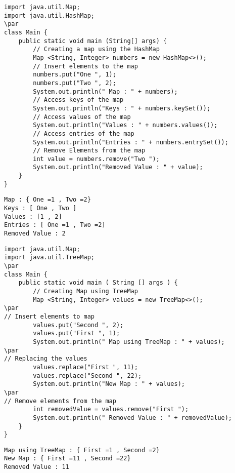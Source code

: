 \documentclass{book}
\def\lthtmlcheckvsize{\ifdim\ht\sizebox<\vsize 
  \ifdim\wd\sizebox<\hsize\expandafter\hfill\fi \expandafter\vfill
  \else\expandafter\vss\fi}%
\begin{document}
{\newpage\clearpage
{}%
\begin{lstlisting}
import java.util.Map;
import java.util.HashMap;
\par
class Main {
	public static void main (String[] args) {
		// Creating a map using the HashMap
		Map <String, Integer> numbers = new HashMap<>();
		// Insert elements to the map
		numbers.put("One ", 1);
		numbers.put("Two ", 2);
		System.out.println(" Map : " + numbers);
		// Access keys of the map
		System.out.println("Keys : " + numbers.keySet());
		// Access values of the map
		System.out.println("Values : " + numbers.values());
		// Access entries of the map
		System.out.println("Entries : " + numbers.entrySet());
		// Remove Elements from the map
		int value = numbers.remove("Two ");
		System.out.println("Removed Value : " + value);
	}
}
\end{lstlisting}%
\lthtmlfigureZ
\lthtmlcheckvsize\clearpage}

{\newpage\clearpage
{}%
\begin{lstlisting}
Map : { One =1 , Two =2}
Keys : [ One , Two ]
Values : [1 , 2]
Entries : [ One =1 , Two =2]
Removed Value : 2
\end{lstlisting}%
\lthtmlfigureZ
\lthtmlcheckvsize\clearpage}

{\newpage\clearpage
{}%
\begin{lstlisting}
import java.util.Map;
import java.util.TreeMap;
\par
class Main {
	public static void main ( String [] args ) {
		// Creating Map using TreeMap
		Map <String, Integer> values = new TreeMap<>();
\par
// Insert elements to map
		values.put("Second ", 2);
		values.put("First ", 1);
		System.out.println(" Map using TreeMap : " + values);
\par
// Replacing the values
		values.replace("First ", 11);
		values.replace("Second ", 22);
		System.out.println("New Map : " + values);
\par
// Remove elements from the map
		int removedValue = values.remove("First ");
		System.out.println(" Removed Value : " + removedValue);
	}
}
\end{lstlisting}%
\lthtmlfigureZ
\lthtmlcheckvsize\clearpage}

{\newpage\clearpage
{}%
\begin{lstlisting}
Map using TreeMap : { First =1 , Second =2}
New Map : { First =11 , Second =22}
Removed Value : 11
\end{lstlisting}%
\lthtmlfigureZ
\lthtmlcheckvsize\clearpage}
\end{document}
